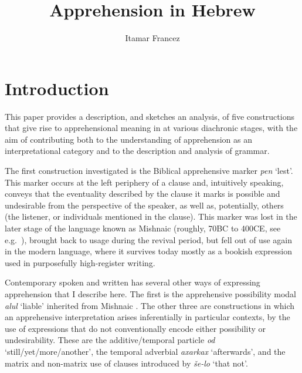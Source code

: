 \documentclass[output=paper,colorlinks,citecolor=brown]{langscibook}
\author{Itamar Francez\affiliation{University of Chicago}}
\title{Apprehension in Hebrew}
\begin{document}
\maketitle

\section{Introduction}
\label{francez:intro}
\largerpage
This paper provides a description, and sketches an analysis, of five constructions that give rise to apprehensional meaning in  at various diachronic stages, with the aim of contributing both to the understanding of apprehension as an interpretational category and to the description and analysis of  grammar. 

The first construction investigated is the Biblical  apprehensive marker \textit{pen} `lest'. This marker occurs at the left periphery of a clause and, intuitively speaking, conveys that the eventuality described by the clause it marks is possible and undesirable from the perspective of the speaker, as well as, potentially, others (the listener, or individuals mentioned in the clause). This marker was lost in the later stage of the language known as Mishnaic  (roughly, 70BC to 400CE, see e.g.\ \citealt{barasher99}), brought back to usage during the revival period, but fell out of use again in the modern language, where it survives today mostly as a bookish expression used in purposefully high-register writing. 

Contemporary spoken and written  has  several other ways of expressing apprehension that I describe here. The first is the apprehensive possibility modal \textit{alul} `liable' inherited from Mishnaic . The other three are constructions in which an apprehensive interpretation arises inferentially in particular contexts, by the use of expressions that do not conventionally encode either possibility or undesirability. These are the additive/temporal particle \textit{od} `still/yet/more/another', the temporal adverbial \textit{axarkax} `afterwards', and the matrix and non-matrix use of clauses introduced by \textit{še-lo} `that not'.
\end{document}
